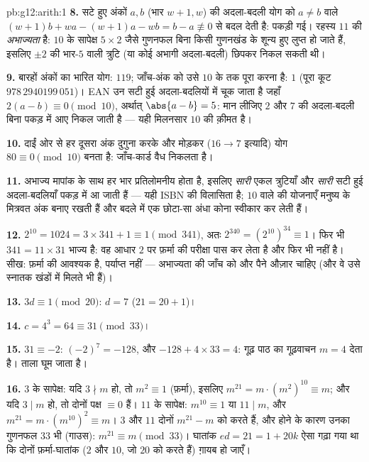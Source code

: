 \begin{solution}{pb:g12:arith:1}
\textbf{8.} सटे हुए अंकों $a, b$ (भार $w + 1, w$) की अदला-बदली योग को $a \neq b$ वाले
$(w+1)b + wa - (w+1)a - wb = b - a \not\equiv 0$ से बदल देती है: पकड़ी गई। रहस्य $11$ की \emph{अभाज्यता} है: $10$ के
सापेक्ष $5 \times 2$ जैसे गुणनफल बिना किसी गुणनखंड के शून्य हुए लुप्त हो जाते हैं,
इसलिए $\pm 2$ की भार-$5$ वाली त्रुटि (या कोई अभागी अदला-बदली) छिपकर निकल सकती
थी।

\textbf{9.} बारहों अंकों का भारित योग: $119$; जाँच-अंक को उसे $10$ के 
तक पूरा करना है: $1$ (पूरा कूट $978\,2940199\,051$)। EAN उन सटी हुई अदला-बदलियों में चूक
जाता है जहाँ $2(a - b) \equiv 0 \pmod{10}$, अर्थात् $\abs{a - b} = 5$: मान लीजिए $2$ और $7$ की अदला-बदली बिना
पकड़ में आए निकल जाती है --- यही मिलनसार  $10$ की क़ीमत है।

\textbf{10.} दाईं ओर से हर दूसरा अंक दुगुना करके और मोड़कर ($16 \to 7$ इत्यादि)
योग $80 \equiv 0
\pmod{10}$ बनता है: जाँच-कार्ड वैध निकलता है।

\textbf{11.} अभाज्य मापांक के साथ हर भार प्रतिलोमनीय होता है, इसलिए
\emph{सारी} एकल त्रुटियाँ और \emph{सारी} सटी हुई अदला-बदलियाँ पकड़ में आ जाती
हैं --- यही ISBN की विलासिता है; $10$ वाले  की योजनाएँ मनुष्य के
मित्रवत अंक बनाए रखती हैं और बदले में एक छोटा-सा अंधा कोना स्वीकार कर लेती
हैं।

\textbf{12.} $2^{10} = 1024 = 3 \times 341 + 1 \equiv 1
\pmod{341}$, अतः $2^{340} = \left(2^{10}\right)^{34} \equiv
1$। फिर भी $341 = 11 \times 31$ भाज्य है: वह आधार $2$ पर फ़र्मा
की परीक्षा पास कर लेता है और फिर भी  नहीं है। सीख: फ़र्मा की 
आवश्यक है, पर्याप्त नहीं --- अभाज्यता की जाँच को और पैने औज़ार चाहिए (और वे
उसे स्नातक खंडों में मिलते भी हैं)।

\textbf{13.} $3d \equiv 1 \pmod{20}$: $d = 7$ ($21 = 20 + 1$)।

\textbf{14.} $c = 4^3 = 64 \equiv 31 \pmod{33}$।

\textbf{15.} $31 \equiv -2$: $(-2)^7 = -128$, और $-128 + 4 \times 33 = 4$: गूढ़ पाठ का गूढ़वाचन $m = 4$ देता है। ताला
घूम जाता है।

\textbf{16.} $3$ के सापेक्ष: यदि $3 \nmid m$ हो, तो $m^2 \equiv 1$ (फ़र्मा), इसलिए $m^{21} = m \cdot \left(m^2\right)^{10} \equiv m$;
और यदि $3 \mid m$ हो, तो दोनों पक्ष $\equiv 0$ हैं। $11$ के सापेक्ष: $m^{10} \equiv 1$ या $11 \mid m$,
और $m^{21} = m \cdot \left(m^{10}\right)^2 \equiv m$। $3$ और $11$ दोनों $m^{21} - m$ को  करते हैं, और  होने
के कारण उनका गुणनफल $33$ भी (गाउस): $m^{21} \equiv m \pmod{33}$। घातांक $ed = 21 = 1 + 20k$ ऐसा गढ़ा गया था कि
दोनों फ़र्मा-घातांक ($2$ और $10$, जो $20$ को  करते हैं) ग़ायब हो
जाएँ।


\end{solution}
